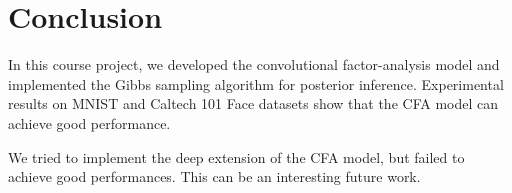 \documentclass{article} %
\begin{document}
\section{Conclusion}
%
In this course project, we developed the convolutional factor-analysis model and implemented the Gibbs sampling algorithm for posterior inference. Experimental results on MNIST and Caltech 101 Face datasets show that the CFA model can achieve good performance.  

We tried to implement the deep extension of the CFA model, but failed to achieve good performances. This can be an interesting future work.


\end{document}
